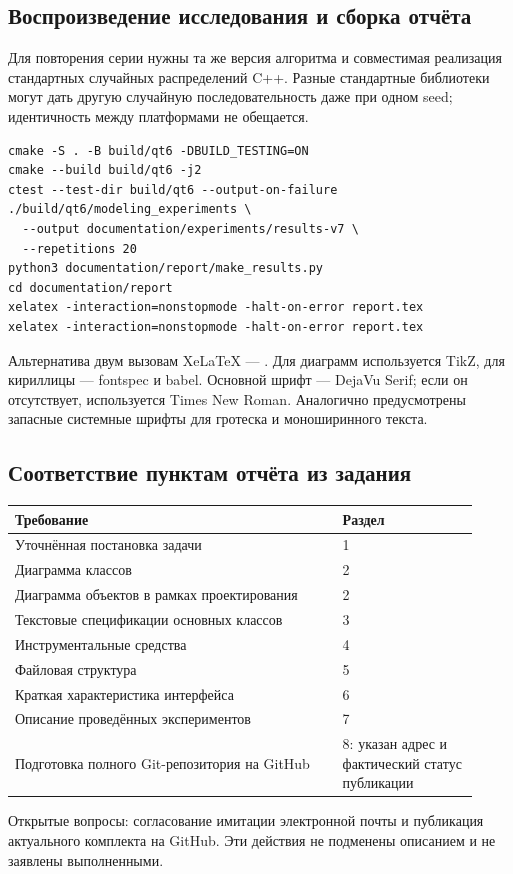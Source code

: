 \subsection{Воспроизведение исследования и сборка отчёта}
Для повторения серии нужны та же версия алгоритма и совместимая реализация стандартных случайных распределений C++. Разные стандартные библиотеки могут дать другую случайную последовательность даже при одном seed; идентичность между платформами не обещается.
\begin{lstlisting}
cmake -S . -B build/qt6 -DBUILD_TESTING=ON
cmake --build build/qt6 -j2
ctest --test-dir build/qt6 --output-on-failure
./build/qt6/modeling_experiments \
  --output documentation/experiments/results-v7 \
  --repetitions 20
python3 documentation/report/make_results.py
cd documentation/report
xelatex -interaction=nonstopmode -halt-on-error report.tex
xelatex -interaction=nonstopmode -halt-on-error report.tex
\end{lstlisting}
Альтернатива двум вызовам XeLaTeX --- . Для диаграмм используется TikZ, для кириллицы --- fontspec и babel. Основной шрифт --- DejaVu Serif; если он отсутствует, используется Times New Roman. Аналогично предусмотрены запасные системные шрифты для гротеска и моноширинного текста.

\subsection{Соответствие пунктам отчёта из задания}
\begin{longtable}{L{0.65\linewidth}L{0.27\linewidth}}
\toprule Требование & Раздел \\\midrule\endhead
Уточнённая постановка задачи & 1 \\
Диаграмма классов & 2 \\
Диаграмма объектов в рамках проектирования & 2 \\
Текстовые спецификации основных классов & 3 \\
Инструментальные средства & 4 \\
Файловая структура & 5 \\
Краткая характеристика интерфейса & 6 \\
Описание проведённых экспериментов & 7 \\
Подготовка полного Git-репозитория на GitHub & 8: указан адрес и фактический статус публикации \\
\bottomrule
\end{longtable}
Открытые вопросы: согласование имитации электронной почты и публикация актуального комплекта на GitHub. Эти действия не подменены описанием и не заявлены выполненными.
